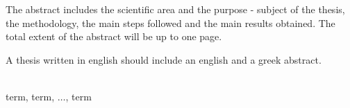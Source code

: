 
\begin{abstracteng}
The abstract includes the scientific area and the purpose - subject of the thesis, the methodology, the main steps followed and the main results obtained. The total extent of the abstract will be up to one page.

A thesis written in english should include an english and a greek abstract.

\vspace*{\fill}
\\ 
term, term, $\dots$, term
\end{abstracteng}